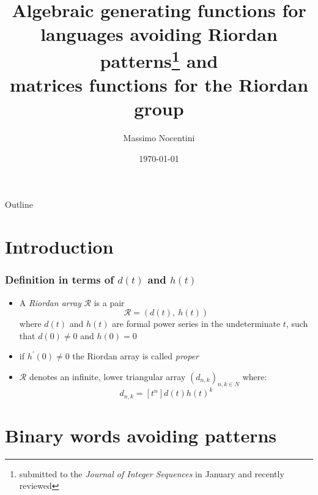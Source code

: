 \documentclass{beamer}
\title{Algebraic generating functions for languages avoiding Riordan
patterns\footnote{\scriptsize submitted to the \emph{Journal of Integer Sequences} in
January and recently reviewed} and\\ matrices functions for the Riordan group}
\author[Merlini, Nocentini] %
{Massimo Nocentini}
\institute[Universities of Somewhere and Elsewhere] %
{
  Dipartimento di Statistica, Informatica, Applicazioni \\
  University of Florence, Italy
}
\date{\today}
\begin{document}
\begin{frame}
  \titlepage
\end{frame}

\begin{frame}{Outline}
  \tableofcontents
\end{frame}




\section{Introduction}

\begin{frame}
\frametitle{Definition in terms of $d(t)$ and $h(t)$}
\begin{itemize}

\item A \emph{Riordan array} $\mathcal{R}$ is a pair
$$\mathcal{R}=(d(t),\ h(t))$$
where $d(t)$ and $h(t)$ are formal power series in the undeterminate $t$, such
that $d(0)\neq 0$ and  $h(0)= 0$ 

\item if $h^\prime(0)\neq 0$ the Riordan array is called \emph{proper}

\item $\mathcal{R}$ denotes an infinite, lower triangular array $(d_{n,k})_{n,k\in N}$ where:
$$d_{n,k}=[t^n]d(t)h(t)^k$$

\end{itemize}
\end{frame}


\section{Binary words avoiding patterns}
\end{document}
